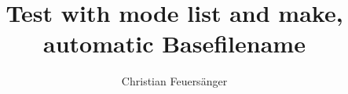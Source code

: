

\tikzexternalize[mode=list and make]

\author{Christian Feuers\"anger}
\title{Test with mode list and make, automatic Basefilename}


\maketitle



